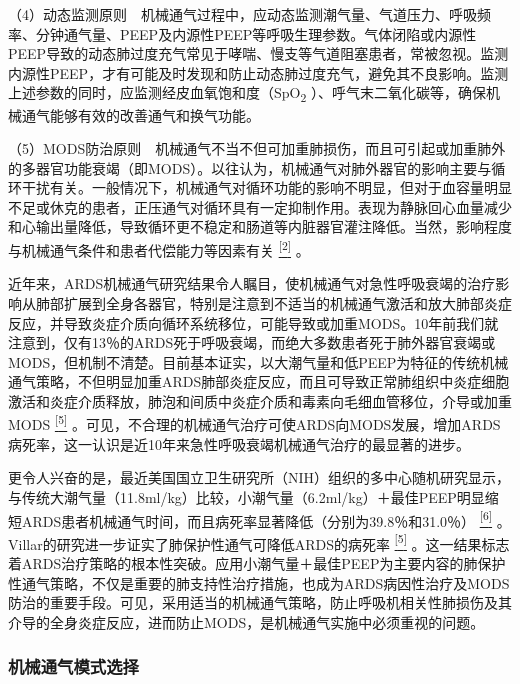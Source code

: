 （4）动态监测原则　机械通气过程中，应动态监测潮气量、气道压力、呼吸频率、分钟通气量、PEEP及内源性PEEP等呼吸生理参数。气体闭陷或内源性PEEP导致的动态肺过度充气常见于哮喘、慢支等气道阻塞患者，常被忽视。监测内源性PEEP，才有可能及时发现和防止动态肺过度充气，避免其不良影响。监测上述参数的同时，应监测经皮血氧饱和度（SpO\textsubscript{2}
）、呼气末二氧化碳等，确保机械通气能够有效的改善通气和换气功能。

（5）MODS防治原则　机械通气不当不但可加重肺损伤，而且可引起或加重肺外的多器官功能衰竭（即MODS）。以往认为，机械通气对肺外器官的影响主要与循环干扰有关。一般情况下，机械通气对循环功能的影响不明显，但对于血容量明显不足或休克的患者，正压通气对循环具有一定抑制作用。表现为静脉回心血量减少和心输出量降低，导致循环更不稳定和肠道等内脏器官灌注降低。当然，影响程度与机械通气条件和患者代偿能力等因素有关
\protect\hyperlink{text00016.htmlux5cux23ch2-15}{\textsuperscript{{[}2{]}}}
。

近年来，ARDS机械通气研究结果令人瞩目，使机械通气对急性呼吸衰竭的治疗影响从肺部扩展到全身各器官，特别是注意到不适当的机械通气激活和放大肺部炎症反应，并导致炎症介质向循环系统移位，可能导致或加重MODS。10年前我们就注意到，仅有13％的ARDS死于呼吸衰竭，而绝大多数患者死于肺外器官衰竭或MODS，但机制不清楚。目前基本证实，以大潮气量和低PEEP为特征的传统机械通气策略，不但明显加重ARDS肺部炎症反应，而且可导致正常肺组织中炎症细胞激活和炎症介质释放，肺泡和间质中炎症介质和毒素向毛细血管移位，介导或加重MODS
\protect\hyperlink{text00016.htmlux5cux23ch5-15}{\textsuperscript{{[}5{]}}}
。可见，不合理的机械通气治疗可使ARDS向MODS发展，增加ARDS病死率，这一认识是近10年来急性呼吸衰竭机械通气治疗的最显著的进步。

更令人兴奋的是，最近美国国立卫生研究所（NIH）组织的多中心随机研究显示，与传统大潮气量（11.8ml/kg）比较，小潮气量（6.2ml/kg）＋最佳PEEP明显缩短ARDS患者机械通气时间，而且病死率显著降低（分别为39.8％和31.0％）
\protect\hyperlink{text00016.htmlux5cux23ch6-15}{\textsuperscript{{[}6{]}}}
。Villar的研究进一步证实了肺保护性通气可降低ARDS的病死率
\protect\hyperlink{text00016.htmlux5cux23ch5-15}{\textsuperscript{{[}5{]}}}
。这一结果标志着ARDS治疗策略的根本性突破。应用小潮气量＋最佳PEEP为主要内容的肺保护性通气策略，不仅是重要的肺支持性治疗措施，也成为ARDS病因性治疗及MODS防治的重要手段。可见，采用适当的机械通气策略，防止呼吸机相关性肺损伤及其介导的全身炎症反应，进而防止MODS，是机械通气实施中必须重视的问题。

\subsubsection{机械通气模式选择}

